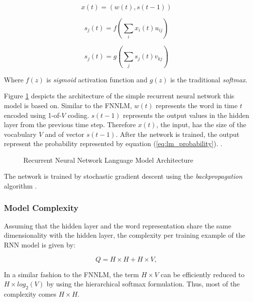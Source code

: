 \begin{equation} x(t) = (w(t), s(t-1))  \end{equation} 

\begin{equation} s_j(t) = f \left( \sum_{i}{x_i(t)u_{ij}}
  \right)   \end{equation}

\begin{equation} s_j(t) = g \left( \sum_{j}{s_j(t)v_{kj}}
  \right)   \end{equation}


Where   $f(z)$ is \textit{sigmoid} activation function and $g(z)$  is the
traditional   \textit{softmax}. 

Figure \ref{fig:RNNLM_architecture} despicts the architecture of the simple
recurrent neural network this model is based on. Similar to the \ac{FNNLM},    $w(t)$ represents the word in time $t$ encoded using 1-of-$V$ coding.  $s(t-1)$ represents the output values in the
hidden layer from the previous time step. Therefore $x(t)$, the input, has
the size of the vocabulary $V$ and of vector $s(t-1)$. After the network is
trained, the output represent the probability represented by equation (\ref{eq:lm_probability}).  \cite{mikolovphd2012}.

\begin{figure}[hptb!]
    \centering
    \caption{Recurrent Neural Network Language Model Architecture}
    \label{fig:RNNLM_architecture}
\end{figure}

The network is trained by  stochastic gradient descent using the
\textit{backpropagation} algorithm \cite{Bishop:1995:NNP:525960}.


\subsubsection{Model Complexity}
\label{sec:sub:sub:mikolov_rnnlm_complexity}

Assuming that the hidden layer and the word representation share the same
dimensionality with the hidden layer, the complexity per training example of the RNN model is
given by:


\begin{equation} Q = H \times H + H \times V,   \end{equation}

In a similar fashion to the \ac{FNNLM}, the term $H \times V$ can be
efficiently reduced to $H \times log_2(V)$ by using the hierarchical softmax
formulation. Thus, most of the complexity comes $H \times H$.

